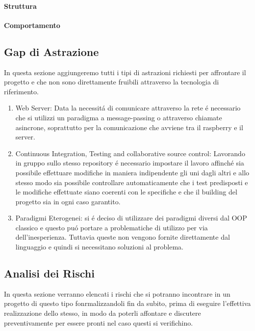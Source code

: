 \paragraph{Struttura}

\paragraph{Comportamento}

\subsection{Gap di Astrazione}

In questa sezione aggiungeremo tutti i tipi di astrazioni richiesti per affrontare il progetto e che non sono direttamente fruibili attraverso la tecnologia di riferimento.

\begin{enumerate}
  \item Web Server: Data la necessit\'a di comunicare attraverso la rete \'e necessario che si utilizzi un paradigma a message-passing o attraverso chiamate asincrone, soprattutto per la comunicazione che avviene tra il raspberry e il server.
  \item Continuous Integration, Testing and collaborative source control: Lavorando in gruppo sullo stesso repository \'e necessario impostare il lavoro affinch\'e sia possibile effettuare modifiche in maniera indipendente gli uni dagli altri e allo stesso modo sia possibile controllare automaticamente che i test predisposti e le modifiche effettuate siano coerenti con le specifiche e che il building del progetto sia in ogni caso garantito.
  \item{Paradigmi Eterogenei}: si \'e deciso di utilizzare dei paradigmi diversi dal OOP classico e questo pu\'o portare a problematiche di utilizzo per via dell'inesperienza. Tuttavia queste non vengono fornite direttamente dal linguaggio e quindi si necessitano soluzioni al problema.
\end{enumerate}

\subsection{Analisi dei Rischi}

In questa sezione verranno elencati i rischi che si potranno incontrare in un progetto di questo tipo fonrmalizzandoli fin da subito, prima di eseguire l'effettiva realizzazione dello stesso, in modo da poterli affontare e discutere preventivamente per essere pronti nel caso questi si verifichino.

